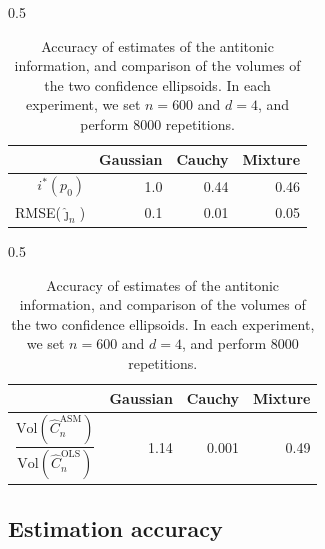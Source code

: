 \documentclass[a4paper]{article}
\theoremstyle{definition}
\begin{document}
\begin{table}[htbp]
\begin{subtable}{0.5\linewidth}
\centering
\begin{tabular}{|r|r|r|r|}
\hline
& Gaussian & Cauchy & Mixture \\ 
\hline
$i^*(p_0)$ & 1.0 & 0.44 & 0.46   \\
RMSE($\hat{\jmath}_n$) & 0.1 & 0.01 & 0.05  \\ 
\hline
\end{tabular}
\caption{Root mean squared errors of $\hat{\jmath}_n$.}
\label{tab:mse_ihat}
\end{subtable}
\begin{subtable}{0.5\linewidth}
\centering
\begin{tabular}{|r|r|r|r|}
\hline
& Gaussian & Cauchy & Mixture  \\ 
\hline
\rule{0pt}{3ex} $\dfrac{\mathrm{Vol}(\hat{C}_n^{\mathrm{ASM}})}{\mathrm{Vol}(\hat{C}_n^{\mathrm{OLS}})}$ & 1.14 & 0.001 & 0.49 \\[1ex]
\hline
\end{tabular}
\caption{Mean ratio of volumes of $\hat{C}_n^{\mathrm{ASM}}$ and $\hat{C}_n^{\mathrm{OLS}}$.}
\label{tab:volume_ratio}
\end{subtable}
\caption{Accuracy of estimates of the antitonic information, and comparison of the volumes of the two confidence ellipsoids. In each experiment, we set $n = 600$ and $d = 4$, and perform 8000 repetitions.}
\end{table}

\subsection{Estimation accuracy}
\label{subsec:sim_estimation}
\end{document}
